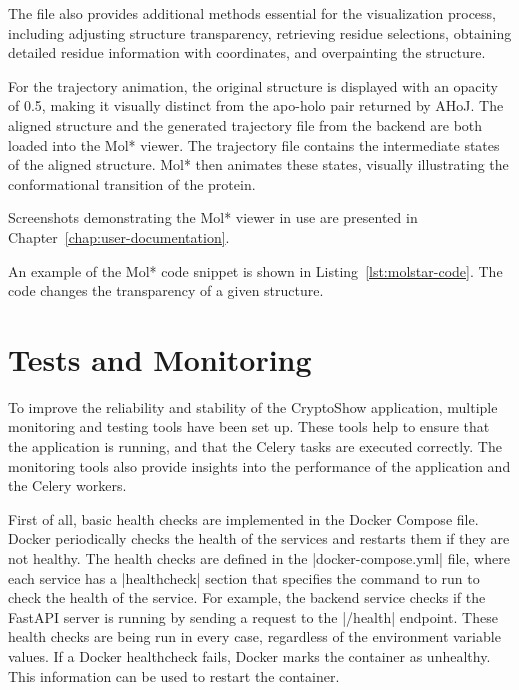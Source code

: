 The file also provides additional methods essential for the visualization process, including adjusting structure transparency, retrieving residue selections, obtaining detailed residue information with coordinates, and overpainting the structure.

For the trajectory animation, the original structure is displayed with an opacity of 0.5, making it visually distinct from the apo-holo pair returned by AHoJ. The aligned structure and the generated trajectory file from the backend are both loaded into the Mol* viewer. The trajectory file contains the intermediate states of the aligned structure. Mol* then animates these states, visually illustrating the conformational transition of the protein.

Screenshots demonstrating the Mol* viewer in use are presented in Chapter~\ref{chap:user-documentation}.

An example of the Mol* code snippet is shown in Listing~\ref{lst:molstar-code}. The code changes the transparency of a given structure.



\section{Tests and Monitoring}
\label{sec:tests-monitoring}

To improve the reliability and stability of the CryptoShow application, multiple monitoring and testing tools have been set up. These tools help to ensure that the application is running, and that the Celery tasks are executed correctly. The monitoring tools also provide insights into the performance of the application and the Celery workers.

First of all, basic health checks are implemented in the Docker Compose file. Docker periodically checks the health of the services and restarts them if they are not healthy. The health checks are defined in the \inline|docker-compose.yml| file, where each service has a \inline|healthcheck| section that specifies the command to run to check the health of the service. For example, the backend service checks if the FastAPI server is running by sending a request to the \inline|/health| endpoint. These health checks are being run in every case, regardless of the environment variable values. If a Docker healthcheck fails, Docker marks the container as unhealthy. This information can be used to restart the container.

